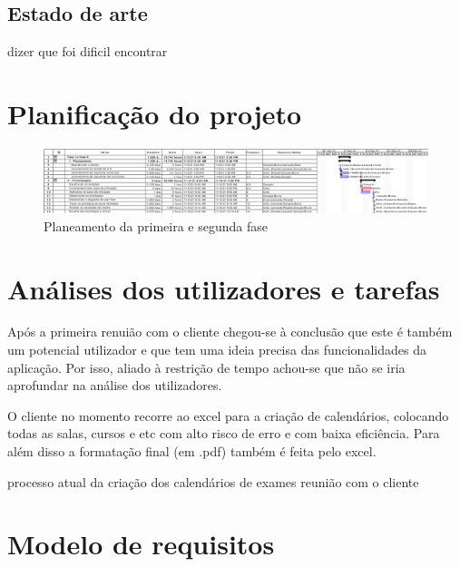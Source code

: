 \documentclass[11pt, twoside]{report}
\begin{document}
	
	
	
	\section{Estado de arte}
	
	
	dizer que foi dificil encontrar
	
	\chapter{Planificação do projeto}

 	
		
	\clearpage
	\begin{landscape}
		\pagestyle{empty}
		
		\begin{figure}[H] 
			\centering 			\includegraphics[width=1.4\textwidth,height=1.4\textheight,keepaspectratio]{image/planeamento_1fase}
			\caption{Planeamento da primeira e segunda fase}
			
		\end{figure}
	\end{landscape}
	
	
	\chapter{Análises dos utilizadores e tarefas}
	
	Após a primeira renuião com o cliente chegou-se à conclusão que  este é também um potencial utilizador e que tem uma ideia precisa das funcionalidades da aplicação. Por isso, aliado à restrição de tempo achou-se que não se iria aprofundar na análise dos utilizadores. 
	
	O cliente no momento recorre ao excel para a criação de calendários,  colocando todas as salas, cursos e etc com alto risco de erro e com baixa eficiência. Para além disso a formatação final (em .pdf) também é feita pelo excel.

	
	



	processo atual da criação dos calendários de exames
	reunião com o cliente
	
	\chapter{Modelo de requisitos}
\end{document}
